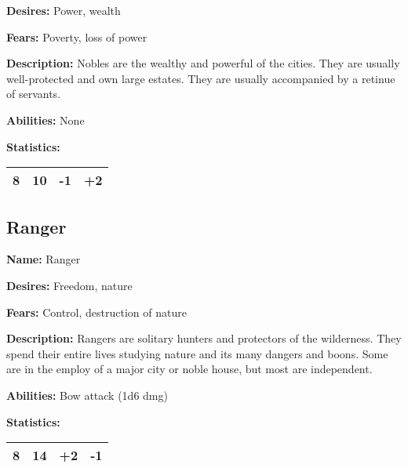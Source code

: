 \begin{multicols}{2}
\textbf{Desires:} Power, wealth

\textbf{Fears:} Poverty, loss of power

\textbf{Description:} Nobles are the wealthy and powerful of the cities. They are usually
well-protected and own large estates. They are usually accompanied by a retinue of servants.

\textbf{Abilities:} None

\textbf{Statistics:}

\begin{center}
{
\begin{xtabular}{|l|l|l|l|}
8 & 10 & -1 & +2 \\
\hline
\end{xtabular}
}
\end{center}

\subsection{Ranger}

\textbf{Name:} Ranger

\textbf{Desires:} Freedom, nature

\textbf{Fears:} Control, destruction of nature

\textbf{Description:} Rangers are solitary hunters and protectors of the wilderness. They
spend their entire lives studying nature and its many dangers and boons. Some are in the
employ of a major city or noble house, but most are independent.

\textbf{Abilities:} Bow attack (1d6 dmg)

\textbf{Statistics:}

\begin{center}
{
\begin{xtabular}{|l|l|l|l|}
8 & 14 & +2 & -1 \\
\hline
\end{xtabular}
}
\end{center}


\end{multicols}
